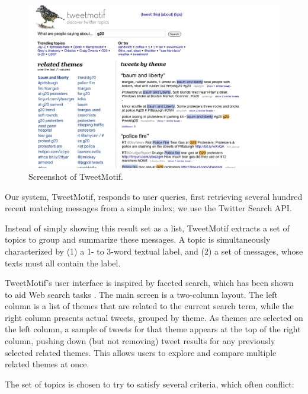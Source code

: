 \documentclass[letterpaper]{article}
\begin{document}
\begin{figure}[htbp]
\begin{center}
\includegraphics[scale=0.3]{screenshot.png}
\caption{Screenshot of TweetMotif.}
\label{screenshot}
\end{center}
\end{figure}

Our system, TweetMotif, responds to user queries, first retrieving several hundred recent matching messages from a simple index; we use the Twitter Search API.

Instead of simply showing this result set as a list, TweetMotif extracts a set of topics to group and summarize these messages.  A topic is simultaneously characterized by (1) a 1- to 3-word textual label, and (2) a set of messages, whose texts must all contain the label.

TweetMotif's user interface is inspired by faceted search, which has been shown to aid Web search tasks \cite{hearst_findingflow_2002}.
The main screen is a two-column layout. The left column is a list of themes that are related to the current search term, while the right column presents actual tweets, grouped by theme. As themes are selected on the left column, a sample of tweets for that theme appears at the top of the right column, pushing down (but not removing) tweet results for any previously selected related themes. This allows users to explore and compare multiple related themes at once. 

The set of topics is chosen to try to satisfy several criteria, which often conflict:
\end{document}
